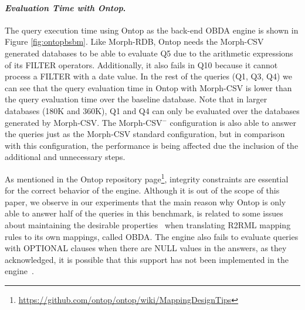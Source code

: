 \noindent\paragraph*{\textit{Evaluation Time with Ontop}.}
The query execution time using Ontop as the back-end OBDA engine is shown in Figure \ref{fig:ontopbsbm}. Like Morph-RDB, Ontop needs the Morph-CSV generated databases to be able to evaluate Q5 due to the arithmetic expressions of its FILTER operators. Additionally, it also fails in Q10 because it cannot process a FILTER with a date value. In the rest of the queries (Q1, Q3, Q4) we can see that the query evaluation time in Ontop with Morph-CSV is lower than the query evaluation time over the baseline database. Note that in larger databases (180K and 360K), Q1 and Q4 can only be evaluated over the databases generated by Morph-CSV. The Morph-CSV$^-$ configuration is also able to answer the queries just as the Morph-CSV standard configuration, but in comparison with this configuration, the performance is being affected due the inclusion of the additional and unnecessary steps.

As mentioned in the Ontop repository page\footnote{\url{https://github.com/ontop/ontop/wiki/MappingDesignTips}}, integrity constraints are essential for the correct behavior of the engine. Although it is out of the scope of this paper, we observe in our experiments that the main reason why Ontop is only able to answer half of the queries in this benchmark, is related to some issues about maintaining the desirable properties~\citep{corcho2020towards} when translating R2RML mapping rules to its own mappings, called OBDA. The engine also fails to evaluate queries with OPTIONAL clauses when there are NULL values in the answers, as they acknowledged, it is possible that this support has not been implemented in the engine~\citep{xiao2018efficient}.

